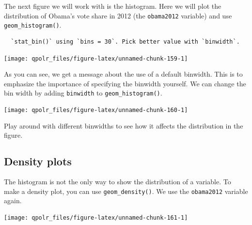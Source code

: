 \documentclass[12pt,oneside]{reedthesis}
\theoremstyle{definition}
\theoremstyle{definition}
\theoremstyle{definition}
\theoremstyle{remark}
\begin{document}
  The next figure we will work with is the histogram. Here we will plot
  the distribution of Obama's vote share in 2012 (the \texttt{obama2012}
  variable) and use \texttt{geom\_histogram()}.
  \begin{Shaded}
  \begin{Highlighting}[]
  \NormalTok{(}\OperatorTok{+}
  \StringTok{  }\NormalTok{() }
  \end{Highlighting}
  \end{Shaded}
  \begin{verbatim}
  `stat_bin()` using `bins = 30`. Pick better value with `binwidth`.
  \end{verbatim}
  \begin{center}\texttt{[image: qpolr\_files/figure-latex/unnamed-chunk-159-1]} \end{center}
  
  As you can see, we get a message about the use of a default binwidth.
  This is to emphasize the importance of specifying the binwidth yourself.
  We can change the bin width by adding \texttt{binwidth} to
  \texttt{geom\_histogram()}.
  \begin{Shaded}
  \begin{Highlighting}[]
  \NormalTok{(}\OperatorTok{+}
  \StringTok{  }\NormalTok{(} \NormalTok{)}
  \end{Highlighting}
  \end{Shaded}
  \begin{center}\texttt{[image: qpolr\_files/figure-latex/unnamed-chunk-160-1]} \end{center}
  
  Play around with different binwidths to see how it affects the
  distribution in the figure.
  
  \subsection{Density plots}\label{density-plots}
  
  The histogram is not the only way to show the distribution of a
  variable. To make a density plot, you can use \texttt{geom\_density()}.
  We use the \texttt{obama2012} variable again.
  \begin{Shaded}
  \begin{Highlighting}[]
  \NormalTok{(}\OperatorTok{+}
  \StringTok{  }\NormalTok{() }
  \end{Highlighting}
  \end{Shaded}
  \begin{center}\texttt{[image: qpolr\_files/figure-latex/unnamed-chunk-161-1]} \end{center}
  
\end{document}
